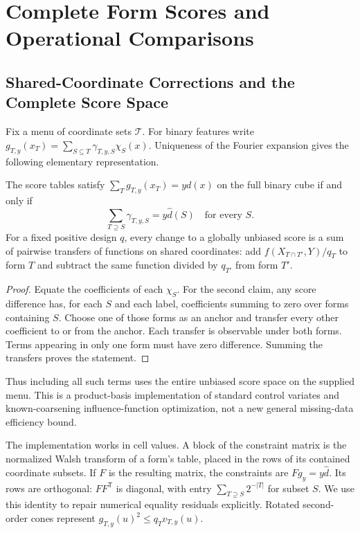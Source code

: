 \section{Complete Form Scores and Operational Comparisons}\label{app:operational}
\subsection{Shared-Coordinate Corrections and the Complete Score Space}
\label{app:fullscores}
Fix a menu of coordinate sets $\mathcal T$. For binary features write
$g_{T,y}(x_T)=\sum_{S\subseteq T}\gamma_{T,y,S}\chi_S(x)$.
Uniqueness of the Fourier expansion gives the following elementary
representation.

\begin{proposition}\label{prop:sharing}
The score tables satisfy $\sum_Tg_{T,y}(x_T)=yd(x)$ on the full binary cube
if and only if
\[
       \sum_{T\supseteq S}\gamma_{T,y,S}=y\widehat d(S)
       \quad\text{for every }S.
\]
For a fixed positive design $q$, every change to a globally unbiased score
is a sum of pairwise transfers of functions on shared coordinates:
add $f(X_{T\cap T'},Y)/q_T$ to form $T$ and subtract the same function
divided by $q_{T'}$ from form $T'$.
\end{proposition}
\begin{proof}
Equate the coefficients of each $\chi_S$. For the second claim, any score
difference has, for each $S$ and each label, coefficients summing to zero
over forms containing $S$. Choose one of those forms as an anchor and
transfer every other coefficient to or from the anchor. Each transfer is
observable under both forms. Terms appearing in only one form must have
zero difference. Summing the transfers proves the statement.
\end{proof}
Thus including all such terms uses the entire unbiased score space on the
supplied menu. This is a product-basis implementation of standard control
variates and known-coarsening influence-function optimization, not a new
general missing-data efficiency bound.

The implementation works in cell values. A block of the constraint matrix
is the normalized Walsh transform of a form's table, placed in the rows of
its contained coordinate subsets. If $F$ is the resulting matrix, the
constraints are $Fg_y=y\widehat d$. Its rows are orthogonal:
$FF^{\mathsf T}$ is diagonal, with entry
$\sum_{T\supseteq S}2^{-|T|}$ for subset $S$. We use this identity to
repair numerical equality residuals explicitly. Rotated second-order cones
represent $g_{T,y}(u)^2\le q_Tv_{T,y}(u)$.

